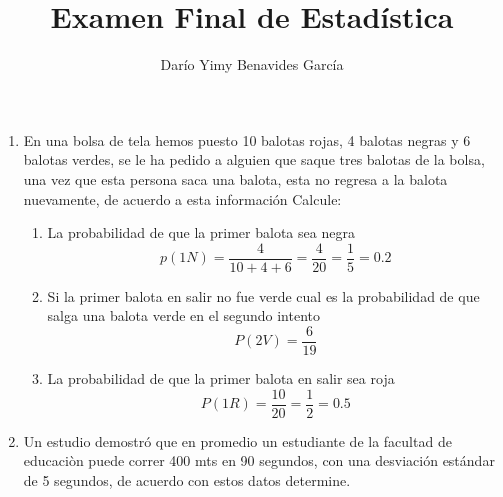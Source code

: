 \documentclass[10pt,a4paper]{article}
\author{Darío Yimy Benavides García}
\title{Examen Final de Estadística}
\begin{document}
\begin{enumerate}
\item En una bolsa de tela hemos puesto 10 balotas rojas, 4 balotas negras y 6 balotas verdes, se le ha pedido a alguien que saque tres balotas de la bolsa, una vez que esta persona saca una balota, esta no regresa a la balota nuevamente, de acuerdo a esta información Calcule:
\begin{enumerate}
\item La probabilidad de que la primer balota sea negra
\[p(1N)=\dfrac{4}{10+4+6}=\dfrac{4}{20}=\dfrac{1}{5}=0.2\]
\item Si la primer balota en salir no fue verde cual es la probabilidad de que salga una balota verde en el segundo intento
\[P(2V)=\dfrac{6}{19}\]
\item La probabilidad de que la primer balota en salir sea roja
\[P(1R)=\dfrac{10}{20}=\dfrac{1}{2}=0.5\]
\end{enumerate}
\item Un estudio demostró que en promedio un estudiante de la facultad de educaciòn puede correr 400 mts en 90 segundos, con una desviación estándar de 5 segundos, de acuerdo con estos datos determine.
\end{enumerate}
\end{document}
